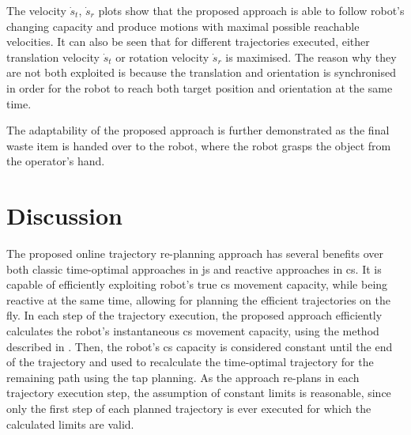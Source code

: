 The velocity $\dot{s}_t$, $\dot{s}_r$ plots show that the proposed approach is able to follow robot's changing capacity and produce motions with maximal possible reachable velocities. It can also be seen that for different trajectories executed, either translation velocity $\dot{s}_t$ or rotation velocity $\dot{s}_r$ is maximised. The reason why they are not both exploited is because the translation and orientation is synchronised in order for the robot to reach both target position and orientation at the same time.

The adaptability of the proposed approach is further demonstrated as the final waste item is handed over to the robot, where the robot grasps the object from the operator's hand. 




\section{Discussion}
\label{ch:topca_discussion}

The proposed online trajectory re-planning approach has several benefits over both classic time-optimal approaches in \gls{js} and reactive approaches in \gls{cs}. It is capable of efficiently exploiting robot's true \gls{cs} movement capacity, while being reactive at the same time, allowing for planning the efficient trajectories on the fly. 
In each step of the trajectory execution, the proposed approach efficiently calculates the robot's instantaneous \gls{cs} movement capacity, using the method described in . Then, the robot's \gls{cs} capacity is considered constant until the end of the trajectory and used to recalculate the time-optimal trajectory for the remaining path using the \gls{tap} planning. As the approach re-plans in each trajectory execution step, the assumption of constant limits is reasonable, since only the first step of each planned trajectory is ever executed for which the calculated limits are valid. 

